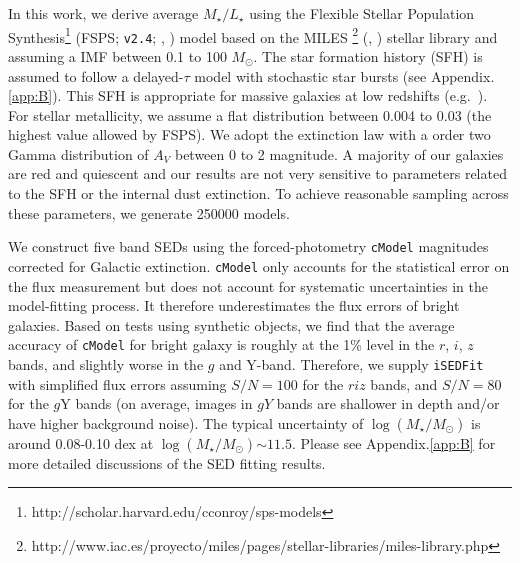 \documentclass{emulateapj}
\def\msun{$M_\odot$}
\def\cmodel{\texttt{cModel}}
\def\logms{{$\log (M_{\star}/M_{\odot})$}}
\def\m2l{{$M_{\star}/L_{\star}$}}
\begin{document}
\begin{CJK*}{UTF8}{gbsn}
    In this work, we derive average \m2l{} using the Flexible Stellar Population 
    Synthesis\footnote{http://scholar.harvard.edu/cconroy/sps-models}
    (FSPS; \texttt{v2.4}; \citealt{FSPS}, \citealt{Conroy2010}) model based on the MILES
    \footnote{http://www.iac.es/proyecto/miles/pages/stellar-libraries/miles-library.php}
    (\citealt{MILES1}, \citealt{MILES2}) stellar library and assuming a 
    \citet{Chabrier2003} IMF between 0.1 to 100 \msun. 
    The star formation history (SFH) is assumed to follow a delayed-$\tau$ model with 
    stochastic star bursts (see Appendix.\ref{app:B}). 
    This SFH is appropriate for massive galaxies at low redshifts 
    (e.g.\ \citealt{Kauffmann2003}). 
    For stellar metallicity, we assume a flat distribution between 0.004 to 0.03 
    (the highest value allowed by FSPS). 
    We adopt the \citet{Calzetti2000} extinction law with a order two Gamma distribution 
    of $A_{V}$ between 0 to 2 magnitude. 
    A majority of our galaxies are red and quiescent and our results are 
    not very sensitive to parameters related to the SFH or the internal dust extinction. 
    To achieve reasonable sampling across these parameters, we generate 250000 models. 
    
    We construct five band SEDs using the forced-photometry \cmodel{} magnitudes corrected 
    for Galactic extinction. 
    \cmodel{} only accounts for the statistical error on the flux measurement but does not 
    account for systematic uncertainties in the model-fitting process. 
    It therefore underestimates the flux errors of bright galaxies. 
    Based on tests using synthetic objects, we find that the average accuracy of \cmodel{} 
    for bright galaxy is roughly at the 1\% level in the $r$, $i$, $z$ bands, and slightly 
    worse in the $g$ and Y-band. 
    Therefore, we supply \texttt{iSEDFit} with simplified flux errors assuming $S/N = 100$ 
    for the $riz$ bands, and $S/N = 80$ for the $g$Y bands (on average, images in 
    $gY$ bands are shallower in depth and/or have higher background noise).  
    The typical uncertainty of \logms{} is around 0.08-0.10 dex at \logms$\sim 11.5$. 
    Please see Appendix.\ref{app:B} for more detailed discussions of the SED fitting
    results.  
   

\end{CJK*}
\end{document}

